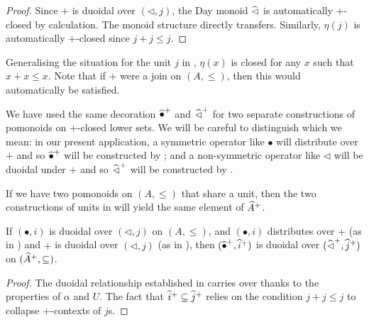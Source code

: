 \begin{proof}
  Since $+$ is duoidal over $(\lhd, j)$, the Day monoid $\mathop{\widehat{\lhd}}$
  is automatically $+$-closed by calculation. The monoid structure
  directly transfers. Similarly, $\eta(j)$ is automatically $+$-closed
  since $j + j \leq j$.
\end{proof}

\begin{rem}
  Generalising the situation for the unit $j$ in , $\eta(x)$ is closed for any $x$
  such that $x + x \leq x$. Note that if $+$ were a join on
  $(A, \leq)$, then this would automatically be satisfied.
\end{rem}

\begin{rem}
  We have used the same decoration $\mathop{\widehat{\bullet}^+}$ and
  $\mathop{\widehat{\lhd}^+}$ for two separate constructions of pomonoids on
  $+$-closed lower sets. We will be careful to distinguish which we
  mean: in our present application, a symmetric operator like
  $\bullet$ will distribute over $+$ and so $\mathop{\widehat{\bullet}^+}$ will
  be constructed by ; and
  a non-symmetric operator like $\lhd$ will be duoidal under $+$ and
  so $\mathop{\widehat{\lhd}^+}$ will be constructed by .
\end{rem}

\begin{rem}
  If we have two pomonoids on $(A, \leq)$ that share a unit, then the
  two constructions of units in  will yield the same element of
  $\widehat{A}^+$.
\end{rem}

\begin{prop}
  If $(\bullet, i)$ is duoidal over $(\lhd, j)$ on $(A, \leq)$, and
  $(\bullet, i)$ distributes over $+$ (as in ) and $+$ is duoidal over
  $(\lhd, j)$ (as in ),
  then $(\mathop{\widehat{\bullet}^+}, \mathop{\widehat{i}^+})$ is duoidal over
  $(\mathop{\widehat{\lhd}^+}, \mathop{\widehat{j}^+})$ on
  $(\widehat{A}^+, \subseteq)$.
\end{prop}

\begin{proof}
  The duoidal relationship established in  carries over thanks to the properties
  of $\alpha$ and $U$. The fact that
  $\mathop{\widehat{i}^+} \subseteq \mathop{\widehat{j}^+}$ relies on the condition
  $j + j \leq j$ to collapse $+$-contexts of $j$s.
\end{proof}


